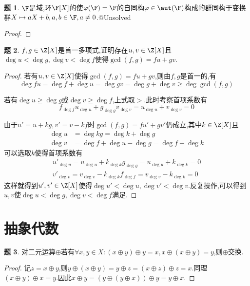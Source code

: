 \documentclass{article}
\theoremstyle{definition}
\newtheorem{exercise}{题}[section]
\begin{document}
\begin{exercise}
    $\F$是域,环$\F[X]$的使$\varphi(\F)=\F$的自同构$\varphi\in \aut(\F)$构成的群同构于变换群$X\mapsto aX+b, a,b\in \F, a\neq 0$.@Unsolved
\end{exercise}
\begin{proof}
    
\end{proof}

\begin{exercise}
    $f,g\in \Z[X]$是首一多项式,证明存在$u,v\in \Z[X]$且$\deg u<\deg g, \deg v<\deg f$使得$\gcd(f,g)=fu+gv$.
\end{exercise}
\begin{proof}
    若有$u,v\in \Z[X]$使得$\gcd(f,g)=fu+gv$,则由$f,g$是首一的,有$$\deg fu=\deg f+\deg u=\deg gv=\deg g+\deg v\geq \deg \gcd(f,g)$$

    若有$\deg u\geq \deg g$或$\deg v\geq \deg f$,上式取$>$.此时考察首项系数有$$f_{\deg f}u_{\deg u}+g_{\deg g}v_{\deg v}=u_{\deg u}+v_{\deg v}=0$$

    由于$u'=u+kg, v'=v-kf$时$\gcd (f,g)=fu'+gv'$仍成立,其中$k\in \Z[X]$且
    $$\begin{aligned}
        \deg u&=\deg kg=\deg k+\deg g\\
        \deg v&=\deg f+\deg u-\deg g=\deg f+\deg k
    \end{aligned}$$
    可以选取$k$使得首项系数有
    $$\begin{aligned}
        u'_{\deg u}=u_{\deg u}+ k_{\deg k}g_{\deg g}=u_{\deg u}+ k_{\deg k}=0\\
        v'_{\deg v}=v_{\deg v}- k_{\deg k}f_{\deg f}=v_{\deg v}- k_{\deg k}=0
    \end{aligned}$$
    这样就得到$u',v'\in \Z[X]$使得$\deg u'<\deg u, \deg v'<\deg v$.反复操作,可以得到$u,v$使$\deg u<\deg g, \deg v<\deg f$满足.
\end{proof}

\section{抽象代数}
\begin{exercise}
    对二元运算$\oplus$若有$\forall x,y\in X: (x\oplus y)\oplus y=x, x\oplus (x\oplus y)=y$,则$\oplus$交换.
\end{exercise}
\begin{proof}
    记$z=x\oplus y$,则$y\oplus (x\oplus y)=y\oplus z=(x\oplus z)\oplus z=x$.同理$(x\oplus y)\oplus x=y$.因此$x\oplus y=(y\oplus (y\oplus x))\oplus y=y\oplus x$.
\end{proof}
\end{document}
